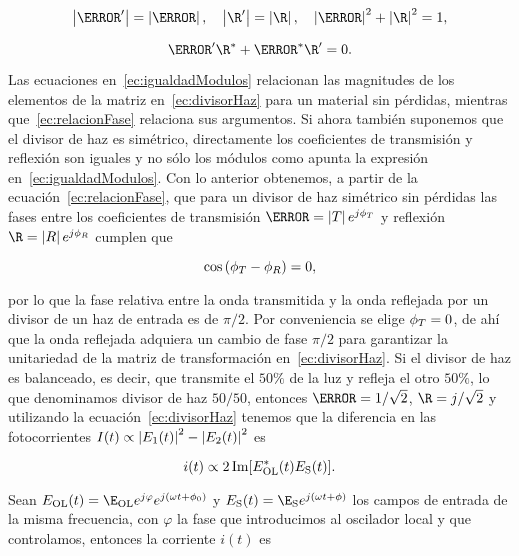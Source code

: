 \begin{equation}
\label{ec:igualdadModulos}
\abs{\T'}=\abs{\T},\quad\abs{\R'}=\abs{\R},\quad\abs{\T}^{2}+\abs{\R}^{2}=1,
\end{equation}

\begin{equation}
\label{ec:relacionFase}
\T'\R^{*}+\T^{*}\R'=0.
\end{equation}

Las ecuaciones en~\ref{ec:igualdadModulos} relacionan las magnitudes de los elementos de la matriz en~\ref{ec:divisorHaz} para un material sin pérdidas, mientras que~\ref{ec:relacionFase} relaciona sus argumentos. Si ahora también suponemos que el divisor de haz es simétrico, directamente los coeficientes de transmisión y reflexión son iguales y no sólo los módulos como apunta la expresión en~\ref{ec:igualdadModulos}. Con lo anterior obtenemos, a partir de la ecuación~\ref{ec:relacionFase}, que para un divisor de haz simétrico sin pérdidas las fases entre los coeficientes de transmisión $\T=\abs{T}e^{j\phi_{T}}$ y reflexión $\R=\abs{R}e^{j\phi_{R}}$ cumplen que

\begin{equation}
\label{ec:restriccionFase}
\cos{\left(\phi_{T}-\phi_{R}\right)}=0,
\end{equation}

por lo que la fase relativa entre la onda transmitida y la onda reflejada por un divisor de un haz de entrada es de $\pi/2$. Por conveniencia se elige $\phi_{T}=0$, de ahí que la onda reflejada adquiera un cambio de fase $\pi/2$ para garantizar la unitariedad de la matriz de transformación en~\ref{ec:divisorHaz}. Si el divisor de haz es balanceado, es decir, que transmite el $50\%$ de la luz y refleja el otro $50\%$, lo que denominamos divisor de haz $50/50$, entonces $\T=1/\sqrt{2}$, $\R=j/\sqrt{2}$ y utilizando la ecuación~\ref{ec:divisorHaz} tenemos que la diferencia en las fotocorrientes $I(t)\propto\left|E_{1}(t)\right|^{2}-\left|E_{2}(t)\right|^{2}$ es

\begin{equation}
\label{ec:fotocorriente}
i(t)\propto2\operatorname{Im}\hspace{-0.6mm}{\left[E_{\mathrm{OL}}^{*}(t)E_{\mathrm{S}}(t)\right]}.
\end{equation}

Sean $E_\sm{\mathrm{OL}}(t)=\E_\sm{\mathrm{OL}}e^{j\varphi}e^{j\left(\omega t+\phi_{0}\right)}$ y $E_\sm{\mathrm{S}}(t)=\E_\sm{\mathrm{S}}e^{j\left(\omega t+\phi\right)}$  los campos de entrada de la misma frecuencia, con $\varphi$ la fase que introducimos al oscilador local y que controlamos, entonces la corriente $i(t)$ es
	
